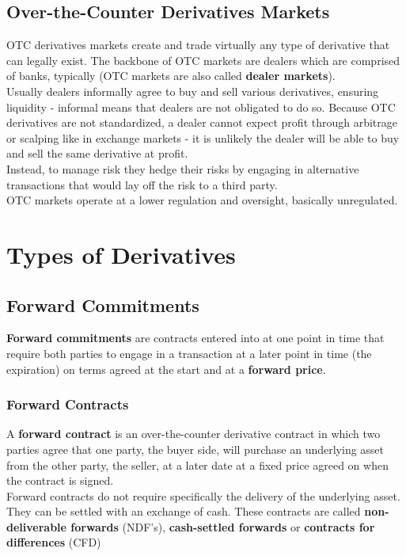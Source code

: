 \documentclass[fleqn,10pt]{SelfArx} %
\begin{document}
\subsection{Over-the-Counter Derivatives Markets}

OTC derivatives markets create and trade virtually any type of derivative that can legally exist. The backbone of OTC markets are dealers which are comprised of banks, typically (OTC markets are also called \textbf{dealer markets}).
\\
Usually dealers informally agree to buy and sell various derivatives, ensuring liquidity - informal means that dealers are not obligated to do so. Because OTC derivatives are not standardized, a dealer cannot expect profit through arbitrage or scalping like in exchange markets - it is unlikely the dealer will be able to buy and sell the same derivative at profit.
\\
Instead, to manage risk they hedge their risks by engaging in alternative transactions that would lay off the risk to a third party.
\\
OTC markets operate at a lower regulation and oversight, basically unregulated.

\newpage
\section{Types of Derivatives}

\subsection{Forward Commitments}

\textbf{Forward commitments} are contracts entered into at one point in time that require both parties to engage in a transaction at a later point in time (the expiration) on terms agreed at the start and at a \textbf{forward price}.

\subsubsection{Forward Contracts}

A \textbf{forward contract} is an over-the-counter derivative contract in which two parties agree that one party, the buyer side, will purchase an underlying asset from the other party, the seller, at a later date at a fixed price agreed on when the contract is signed.
\\
Forward contracts do not require specifically the delivery of the underlying asset. They can be settled with an exchange of cash. These contracts are called \textbf{non-deliverable forwards} (NDF's), \textbf{cash-settled forwards} or \textbf{contracts for differences} (CFD)
\end{document}
